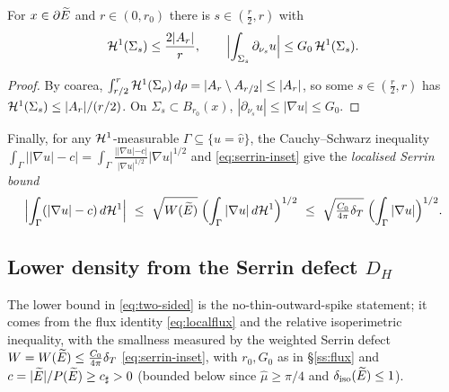 \begin{lemma}\label{lem:spherical}
For $x\in\partial\widetilde E$ and $r\in(0,r_0)$ there is $s\in(\tfrac r2,r)$ with
\begin{equation}\label{eq:spherical}
   \mathcal{H}^1(\Sigma_s)\le \frac{2|A_r|}{r},
   \qquad
   \Bigl|\int_{\Sigma_s}\partial_{\nu_s}u\Bigr|\le G_0\,\mathcal{H}^1(\Sigma_s).
\end{equation}
\end{lemma}

\begin{proof}
By coarea, $\int_{r/2}^{r}\mathcal{H}^1(\Sigma_\rho)\,d\rho=|A_r\setminus
A_{r/2}|\le|A_r|$, so some $s\in(\tfrac r2,r)$ has
$\mathcal{H}^1(\Sigma_s)\le|A_r|/(r/2)$. On $\Sigma_s\subset B_{r_0}(x)$,
$|\partial_{\nu_s}u|\le|\nabla u|\le G_0$.
\end{proof}

Finally, for any $\mathcal{H}^1$-measurable $\Gamma\subseteq\{u=\hat v\}$, the
Cauchy--Schwarz inequality
$\int_\Gamma\big||\nabla u|-c\big|=\int_\Gamma\frac{||\nabla
u|-c|}{|\nabla u|^{1/2}}|\nabla u|^{1/2}$ and
\eqref{eq:serrin-inset} give the \emph{localised Serrin bound}
\begin{equation}\label{eq:serrin-local}
   \Bigl|\int_\Gamma(|\nabla u|-c)\,d\mathcal{H}^1\Bigr|
   \ \le\ \sqrt{W(\widetilde E)}\;\Bigl(\int_\Gamma|\nabla u|\,d\mathcal{H}^1\Bigr)^{1/2}
   \ \le\ \sqrt{\tfrac{C_0}{4\pi}\delta_T}\;\Bigl(\int_\Gamma|\nabla u|\Bigr)^{1/2}.
\end{equation}

\subsection{Lower density from the Serrin defect $D_H$}

The lower bound in \eqref{eq:two-sided} is the no-thin-outward-spike
statement; it comes from the flux identity \eqref{eq:localflux} and the
relative isoperimetric inequality, with the smallness measured by the
weighted Serrin defect $W=W(\widetilde E)\le\tfrac{C_0}{4\pi}\delta_T$
\eqref{eq:serrin-inset}, with $r_0,G_0$ as in \S\ref{ss:flux} and
$c=|\widetilde E|/P(\widetilde E)\ge c_\sharp>0$ (bounded below since $\hat\mu\ge\pi/4$
and $\delta_{\mathrm{iso}}(\widetilde E)\le1$).

